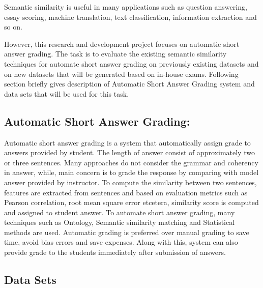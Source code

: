 \documentclass{article}
\begin{document}
Semantic similarity is useful in many applications such as question answering, essay scoring, machine translation, text classification, information extraction and so on.

However, this research and development project focuses on automatic short answer grading. The task is to evaluate the existing semantic similarity techniques for automate short answer grading on previously existing datasets and on new datasets that will be generated based on in-house exams. Following section briefly gives description of Automatic Short Answer Grading system and data sets that will be used for this task.
\subsection{Automatic Short Answer Grading:}
Automatic short answer grading is a system that automatically assign grade to answers provided by student. The length of answer consist of approximately two or three sentences.  Many approaches do not consider the grammar and coherency in answer, while, main concern is to grade the response by comparing with model answer provided by instructor. To compute the similarity between two sentences, features are extracted from sentences and based on evaluation metrics such as Pearson correlation, root mean square error etcetera, similarity score is computed and assigned to student answer. To automate short answer grading, many techniques such as Ontology, Semantic similarity matching and Statistical methods are used\cite{ASAG}. Automatic grading is preferred over manual grading to save time, avoid bias errors and save expenses. Along with this, system can also provide grade to the students immediately after submission of answers.

\subsection{Data Sets} 
\end{document}
